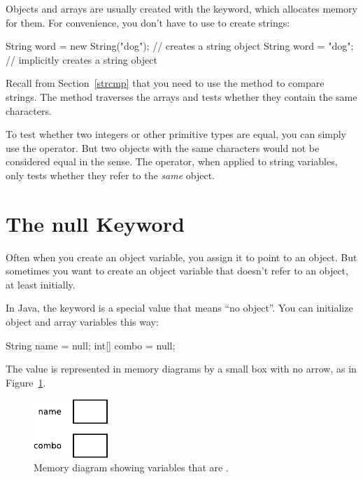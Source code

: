 Objects and arrays are usually created with the  keyword, which allocates memory for them. %
For convenience, you don't have to use  to create strings:

\begin{code}
String word = new String("dog");  // creates a string object
String word = "dog";   // implicitly creates a string object
\end{code}


Recall from Section~\ref{strcmp} that you need to use the  method to compare strings.
The  method traverses the arrays and tests whether they contain the same characters.

To test whether two integers or other primitive types are equal, you can simply use the \java{==} operator.
But two  objects with the same characters would not be considered equal in the \java{==} sense.
The \java{==} operator, when applied to string variables, only tests whether they refer to the {\em same} object.


\section{The null Keyword}

Often when you create an object variable, you assign it to point to an object.  But sometimes you want to create an object variable that doesn't refer to an object, at least initially.


In Java, the keyword  is a special value that means ``no object''.
You can initialize object and array variables this way:

\begin{code}
String name = null;
int[] combo = null;
\end{code}

The value  is represented in memory diagrams by a small box with no arrow, as in Figure~\ref{fig.mem4}.

\begin{figure}[!ht]
\begin{center}
\includegraphics[width=80pt]{figs/mem4.pdf}
\caption{Memory diagram showing variables that are .}
\label{fig.mem4}
\end{center}
\end{figure}

